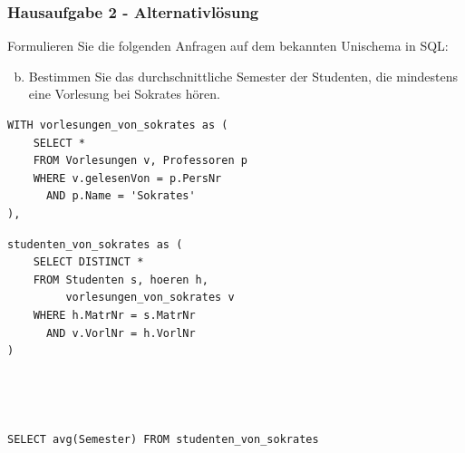 \begin{frame}[fragile]
	\frametitle{Hausaufgabe 2 - Alternativlösung}
	\vspace{0.25cm}

	\begin{multicols}{2}
		Formulieren Sie die folgenden Anfragen auf dem bekannten Unischema in SQL:
		\begin{enumerate}[a)]
			\setcounter{enumi}{1}
			\item Bestimmen Sie das durchschnittliche Semester der Studenten, die mindestens eine Vorlesung bei Sokrates hören.
		\end{enumerate}
		\begin{verbatim}
WITH vorlesungen_von_sokrates as (
	SELECT * 
	FROM Vorlesungen v, Professoren p
	WHERE v.gelesenVon = p.PersNr
	  AND p.Name = 'Sokrates'
),
		\end{verbatim}
		\vfill\columnbreak

		\begin{verbatim}
studenten_von_sokrates as (
	SELECT DISTINCT *
	FROM Studenten s, hoeren h, 
		 vorlesungen_von_sokrates v
	WHERE h.MatrNr = s.MatrNr 
	  AND v.VorlNr = h.VorlNr
)




SELECT avg(Semester) FROM studenten_von_sokrates
		\end{verbatim}
	\end{multicols}
\end{frame}

